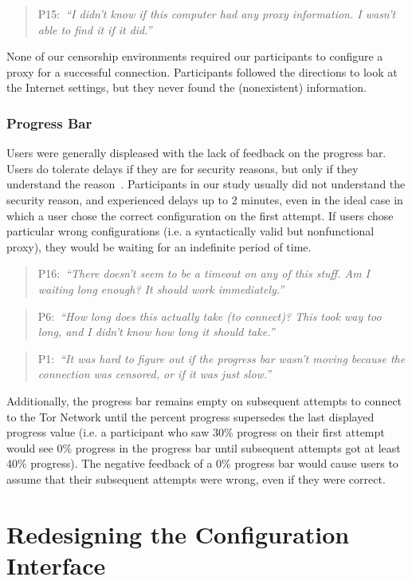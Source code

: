 \documentclass[USenglish,oneside,twocolumn]{article}
\newcommand{\pquote}[2]{
\begin{quotation}
\noindent #1:~\textit{``#2''}
\end{quotation}
}
\begin{document}
\pquote{P15}{I didn't know if this computer had any proxy information. I wasn't able to find it if it did.}

None of our censorship environments required our participants to configure a proxy for a successful connection. Participants followed the directions to look at the Internet settings, but they never found the (nonexistent) information.

\subsubsection{Progress Bar} 
Users were generally displeased with the lack of feedback on the progress bar. Users do tolerate delays if they are for security reasons, but only if they understand the reason~\cite{egelmanplease}. Participants in our study usually did not understand the security reason, and experienced delays up to 2 minutes, even in the ideal case in which a user chose the correct configuration on the first attempt. If users chose particular wrong configurations (i.e. a syntactically valid but nonfunctional proxy), they would be waiting for an indefinite period of time. 

\pquote{P16}{There doesn't seem to be a timeout on any of this stuff. Am I waiting long enough? It should work immediately.}
\pquote{P6}{How long does this actually take (to connect)? This took way too long, and I didn't know how long it should take.}
\pquote{P1}{It was hard to figure out if the progress bar wasn't moving because the connection was censored, or if it was just slow.}

Additionally, the progress bar remains empty on subsequent attempts to connect to the Tor Network until the percent progress supersedes the last displayed progress value (i.e. a participant who saw 30\% progress on their first attempt would see 0\% progress in the progress bar until subsequent attempts got at least 40\% progress). The negative feedback of a 0\% progress bar would cause users to assume that their subsequent attempts were wrong, even if they were correct. 

\section{Redesigning the Configuration Interface}
\end{document}
